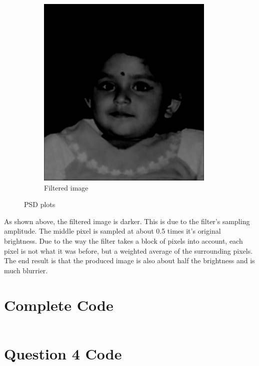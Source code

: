 \documentclass{article}
\begin{document}
\begin{figure}[H]
\begin{subfigure}[b]{0.45\textwidth}
        \includegraphics[width=\textwidth]{ayantika_filt.png}
        \caption{Filtered image}
    \end{subfigure}
    \caption{PSD plots}
\end{figure}

As shown above, the filtered image is darker. This is due to the filter's sampling amplitude. The middle pixel is sampled at about 0.5 times it's original brightness. Due to the way the filter takes a block of pixels into account, each pixel is not what it was before, but a weighted average of the surrounding pixels. The end result is that the produced image is also about half the brightness and is much blurrier.

\pagebreak
\appendix
\section{Complete Code}
\inputminted{Matlab}{Lab5.m}

\pagebreak
\section{Question 4 Code}
\inputminted{Matlab}{Lab5Q4.m}
\end{document}
